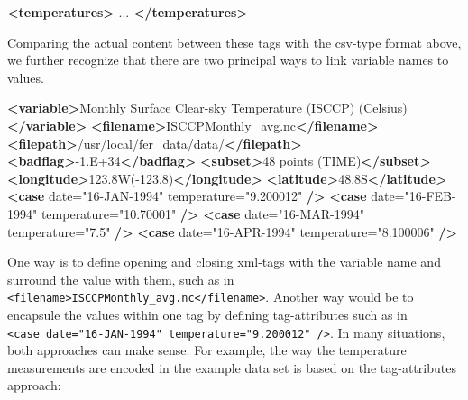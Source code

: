 \documentclass[
  12pt,
]{style/krantz}
\newenvironment{Shaded}{\begin{snugshade}}{\end{snugshade}}
\newcommand{\KeywordTok}[1]{\textcolor[rgb]{0.13,0.29,0.53}{\textbf{#1}}}
\newcommand{\NormalTok}[1]{#1}
\newcommand{\OtherTok}[1]{\textcolor[rgb]{0.56,0.35,0.01}{#1}}
\newcommand{\StringTok}[1]{\textcolor[rgb]{0.31,0.60,0.02}{#1}}
\begin{document}
\begin{Shaded}
\begin{Highlighting}[]
  \KeywordTok{\textless{}temperatures\textgreater{}}
\NormalTok{...}
  \KeywordTok{\textless{}/temperatures\textgreater{}}
\end{Highlighting}
\end{Shaded}

Comparing the actual content between these tags with the csv-type format above, we further recognize that there are two principal ways to link variable names to values.

\begin{Shaded}
\begin{Highlighting}[]
    \KeywordTok{\textless{}variable\textgreater{}}\NormalTok{Monthly Surface Clear{-}sky Temperature (ISCCP) (Celsius)}\KeywordTok{\textless{}/variable\textgreater{}}
    \KeywordTok{\textless{}filename\textgreater{}}\NormalTok{ISCCPMonthly\_avg.nc}\KeywordTok{\textless{}/filename\textgreater{}}
    \KeywordTok{\textless{}filepath\textgreater{}}\NormalTok{/usr/local/fer\_data/data/}\KeywordTok{\textless{}/filepath\textgreater{}}
    \KeywordTok{\textless{}badflag\textgreater{}}\NormalTok{{-}1.E+34}\KeywordTok{\textless{}/badflag\textgreater{}}
    \KeywordTok{\textless{}subset\textgreater{}}\NormalTok{48 points (TIME)}\KeywordTok{\textless{}/subset\textgreater{}}
    \KeywordTok{\textless{}longitude\textgreater{}}\NormalTok{123.8W({-}123.8)}\KeywordTok{\textless{}/longitude\textgreater{}}
    \KeywordTok{\textless{}latitude\textgreater{}}\NormalTok{48.8S}\KeywordTok{\textless{}/latitude\textgreater{}}
    \KeywordTok{\textless{}case}\OtherTok{ date=}\StringTok{"16{-}JAN{-}1994"}\OtherTok{ temperature=}\StringTok{"9.200012"} \KeywordTok{/\textgreater{}}
    \KeywordTok{\textless{}case}\OtherTok{ date=}\StringTok{"16{-}FEB{-}1994"}\OtherTok{ temperature=}\StringTok{"10.70001"} \KeywordTok{/\textgreater{}}
    \KeywordTok{\textless{}case}\OtherTok{ date=}\StringTok{"16{-}MAR{-}1994"}\OtherTok{ temperature=}\StringTok{"7.5"} \KeywordTok{/\textgreater{}}
    \KeywordTok{\textless{}case}\OtherTok{ date=}\StringTok{"16{-}APR{-}1994"}\OtherTok{ temperature=}\StringTok{"8.100006"} \KeywordTok{/\textgreater{}}
\end{Highlighting}
\end{Shaded}

One way is to define opening and closing xml-tags with the variable name and surround the value with them, such as in \texttt{\textless{}filename\textgreater{}ISCCPMonthly\_avg.nc\textless{}/filename\textgreater{}}. Another way would be to encapsule the values within one tag by defining tag-attributes such as in \texttt{\textless{}case\ date="16-JAN-1994"\ temperature="9.200012"\ /\textgreater{}}. In many situations, both approaches can make sense. For example, the way the temperature measurements are encoded in the example data set is based on the tag-attributes approach:
\end{document}
